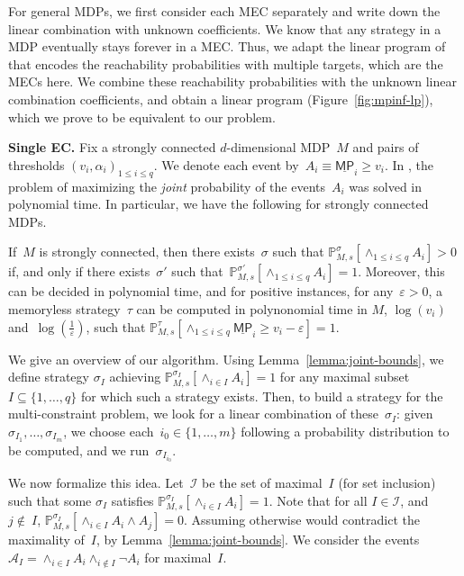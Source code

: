\documentclass{llncs}
\newcommand*{\pr}{\mathbb{P}}
\newcommand*{\mpinf}{\ensuremath{\underline{\mathsf{MP}}}}
\newcommand\calI{\ensuremath{\mathcal{I}}}
\newcommand\calA{\ensuremath{\mathcal{A}}}
\begin{document}
For general MDPs, 
we first consider each MEC separately and write down the linear combination with unknown coefficients.
We know that any strategy in a MDP eventually stays forever in a MEC. Thus, we adapt the linear program
of~\cite{EKVY-lmcs08} that encodes the reachability probabilities with multiple targets, which are the MECs here.
We combine these reachability probabilities with the unknown linear combination coefficients, and obtain a linear program 
(Figure~\ref{fig:mpinf-lp}), which we prove to be equivalent to our problem.

\smallskip\noindent\textbf{Single EC.}
Fix a strongly connected $d$-dimensional MDP~$M$ and 
pairs of thresholds $(v_i,\alpha_i)_{1\leq i\leq q}$. We denote each event by~$A_i \equiv \mpinf_i \geq v_i$.
In \cite{BBCFK-lmcs14}, the problem of maximizing the \emph{joint} probability of the events~$A_i$ was solved in polynomial time.
In particular, we have the following for strongly connected MDPs.
\begin{lemma}
  \label{lemma:joint-bounds}
	If~$M$ is strongly connected, then there exists~$\sigma$ such that ${\pr_{M,s}^\sigma[\wedge_{1\leq i\leq q} A_i]>0}$ if, and only if
    there exists~$\sigma'$ such that~$\pr_{M,s}^{\sigma'}[\wedge_{1\leq i\leq q} A_i]=1$.
    Moreover, this can be decided in polynomial time, and for positive instances, for any~$\varepsilon>0$,
    a memoryless strategy~$\tau$ can be computed in polynonomial time in $M$, $\log(v_i)$ and~$\log(\frac{1}{\varepsilon})$, such that
    \(
    \pr_{M,s}^\tau[\wedge_{1\leq i\leq q} \mpinf_i \geq v_i - \varepsilon] = 1.
    \)
\end{lemma}

We give an overview of our algorithm.
Using Lemma~\ref{lemma:joint-bounds}, we define strategy $\sigma_I$ achieving $\pr_{M,s}^{\sigma_I}[\wedge_{i \in I} A_i]=1$
for any maximal subset~$I \subseteq \{1,\ldots,q\}$ for which such a strategy exists.
Then, to build a strategy for the multi-constraint problem, we look for a linear combination of these~$\sigma_I$: given $\sigma_{I_1},\ldots, \sigma_{I_m}$, we choose each~$i_0 \in \{1,\ldots,m\}$ following a probability distribution to be computed, and we run~$\sigma_{I_{i_0}}$.

We now formalize this idea. Let~$\calI$ be the set of maximal~$I$ (for set inclusion) such that some $\sigma_I$
satisfies $\pr_{M,s}^{\sigma_I}[\wedge_{i \in I}A_i]=1$. 
Note that for all $I \in \calI$, and~$j \not\in~I$,
$\pr_{M,s}^{\sigma_I}[\wedge_{i \in I} A_i \land A_j] = 0$. Assuming otherwise would contradict the maximality of~$I$, by Lemma~\ref{lemma:joint-bounds}.
We consider the events $\calA_I = \wedge_{i \in I} A_i \wedge_{i \not \in I}\lnot A_i$
for maximal~$I$.
\end{document}
